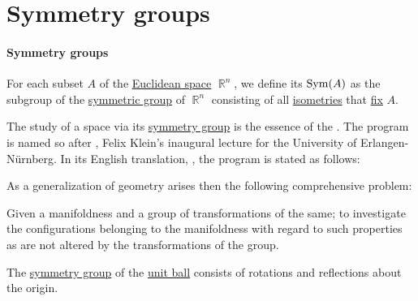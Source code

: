 \section{Symmetry groups}\label{sec:symmetry_groups}

\paragraph{Symmetry groups}

\begin{definition}\label{def:symmetry_group}
  For each subset \( A \) of the \hyperref[def:euclidean_space]{Euclidean space} \( \BbbR^n \), we define its  \( \op{Sym}(A) \) as the subgroup of the \hyperref[def:symmetric_group]{symmetric group} of \( \BbbR^n \) consisting of all \hyperref[def:isometry]{isometries} that \hyperref[def:function_fixed_point]{fix} \( A \).
\end{definition}

\begin{remark}\label{rem:erlangen_program}
  The study of a space via its \hyperref[def:symmetry_group]{symmetry group} is the essence of the . The program is named so after \cite{Klein1893ErlangenProgram}, Felix Klein's inaugural lecture for the University of Erlangen-N\"urnberg. In its English translation, \cite[218]{Klein1893ErlangenProgramEnglish}, the program is stated as follows:
  \begin{displayquote}
    As a generalization of geometry arises then the following comprehensive problem:
    \begin{displayquote}
      Given a manifoldness and a group of transformations of the same; to investigate the configurations belonging to the manifoldness with regard to such properties as are not altered by the transformations of the group.
    \end{displayquote}
  \end{displayquote}
\end{remark}

\begin{proposition}\label{thm:symmetry_group_of_sphere}
  The \hyperref[def:symmetry_group]{symmetry group} of the \hyperref[def:metric_space/ball]{unit ball} consists of rotations and reflections about the origin.
\end{proposition}
